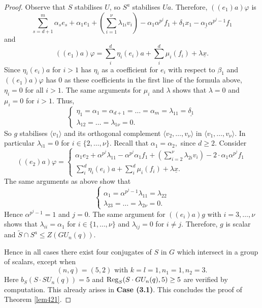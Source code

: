\begin{proof}
Observe that $S$ stabilises  $U$, so $S^a$ stabilises $Ua.$ Therefore, $((e_{1})a)\varphi$ is
\begin{equation*}%
\sum_{s=d+1}^m \alpha_s e_s +  \alpha_1 e_1  + (\sum_{i=1}^{\nu}\lambda_{1i} v_i) -\alpha_1 \alpha^{p^j} f_1+ \underline{\delta_1 x_1 -\alpha_1 \alpha^{p^j-1} f_1} 
\end{equation*}
and
$$((e_{1})a)\varphi=\sum_i^{d} \eta_i (e_i)a+ \sum_i^{d}\mu_{i}(f_{i})+ \lambda \underline{x}.$$
Since $\eta_i(e_i)a$ for $i>1$ has $\eta_i$ as a coefficient for $e_i$ with respect to $\beta_1$ and $((e_1)a)\varphi$ has $0$ as these coefficients in the first line of the formula above, $\eta_i=0$ for all $i>1.$ The same arguments for $\mu_i$ and $\lambda$ shows that $\lambda=0$ and $\mu_i=0$ for $i>1.$ Thus, $$
\begin{cases}
\eta_1=\alpha_1 = \alpha_{d+1}= \ldots = \alpha_m=\lambda_{11}= \underline{\delta_1}\\
\lambda_{12}= \ldots = \lambda_{1 \nu}=0.
\end{cases}
$$
So $g$ stabilises $\langle v_1 \rangle$ and its orthogonal complement $\langle v_2, \ldots, v_{\nu}  \rangle$ in $\langle v_1, \ldots, v_{\nu}  \rangle$. In particular $\lambda_{i1}=0$ for $i \in \{2, \ldots, \nu\}.$    Recall that $\alpha_1=\alpha_2,$ since $d \ge 2.$ Consider 
\begin{equation*}%
((e_{2})a)\varphi=
\begin{cases}
 \alpha_1 e_2  + \alpha^{p^j} \lambda_{11} - \alpha^{p^j} \alpha_1 f_1 + (\sum_{i=2}^{\nu}\lambda_{2i} v_i) - 2 \cdot \alpha_1 \alpha^{p^j} f_1 \\
\sum_i^{d} \eta_i (e_i)a+ \sum_i^{d}\mu_{i}(f_{i})+ \lambda \underline{x}.
\end{cases}
\end{equation*}
The same arguments as above show that 
$$
\begin{cases}
\alpha_1 = \alpha^{p^j-1} \lambda_{11} = \lambda_{22} \\ 
\lambda_{23}= \ldots = \lambda_{2 \nu}=0.
\end{cases}
$$
 Hence $\alpha^{p^j-1}=1$ and $j=0.$
The same argument for $((e_{i})a)g$ with $i=3, \ldots,  \nu$ shows that $\lambda_{ii}=\alpha_1$ for $i \in \{1, \ldots, \nu\}$ and $\lambda_{ij}=0$ for $i \ne j.$ Therefore, $g$  is scalar and $\tilde{S} \cap S^a \le Z(GU_n(q)).$


\medskip
Hence in all cases there exist four conjugates of $S$ in $G$ which intersect in a group of scalars, except when $$(n,q)=(5,2) \text{ with } k=l=1, n_1=1, n_2=3.$$ Here $b_S(S \cdot SU_n(q))=5$ and $\mathrm{Reg}_S(S \cdot GU_n(q),5)\ge 5$ are verified by computation. This already arises in {\bf Case (3.1)}. This concludes the proof of Theorem \ref{lem421}.
\end{proof}

